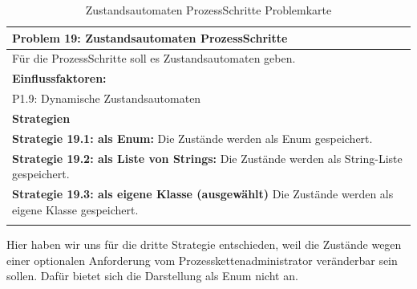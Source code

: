 \documentclass[enabledeprecatedfontcommands,fontsize=12pt,paper=a4,twoside]{scrartcl}
\begin{document}
\begin{table}[H]
    \centering
    \begin{tabular}{|p{15cm}|}
    \hline
          \textbf{Problem 19:} Zustandsautomaten ProzessSchritte
          \\ \hline
          Für die ProzessSchritte soll es Zustandsautomaten geben.
          \\ \hline
          \textbf{Einflussfaktoren: } \\
         P1.9: Dynamische Zustandsautomaten \\
          \hline
          \textbf{Strategien} \\ \hline
          	 {}          
           \label{strategie:19.1} 
	\textbf{Strategie 19.1: als Enum:} Die Zustände werden als Enum gespeichert. \\
	{}          
           \label{strategie:19.2} 
	\textbf{Strategie 19.2: als Liste von Strings:} Die Zustände werden als String-Liste gespeichert. \\
	\textbf{Strategie 19.3: als eigene Klasse (ausgewählt)} Die Zustände werden als eigene Klasse gespeichert. \\
          \\ \hline
    \end{tabular}
    \caption{Zustandsautomaten ProzessSchritte Problemkarte}
    \label{tab:ProblemKarte19}
\end{table}
Hier haben wir uns für die dritte Strategie entschieden, weil die Zustände wegen einer optionalen Anforderung vom Prozesskettenadministrator veränderbar sein sollen. Dafür bietet sich die Darstellung als Enum nicht an. \\
\end{document}
